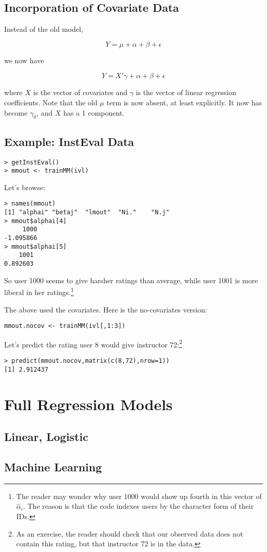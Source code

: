 \subsection{Incorporation of Covariate Data}

Instead of the old model, 

\begin{equation}
Y = \mu + \alpha + \beta + \epsilon
\end{equation}

we now have

\begin{equation}
Y = X' \gamma + \alpha + \beta + \epsilon
\end{equation}

where $X$ is the vector of covariates and $\gamma$ is the vector of
linear regression coefficients.  Note that the old $\mu$ term is now
absent, at least explicitly.  It now has become $\gamma_0$, and $X$ has
a 1 component.

\subsection{Example:  InstEval Data}

\begin{lstlisting}
> getInstEval()
> mmout <- trainMM(ivl)
\end{lstlisting}

Let's browse:

\begin{lstlisting}
> names(mmout)
[1] "alphai" "betaj"  "lmout"  "Ni."    "N.j" 
> mmout$alphai[4]
     1000 
-1.095866 
> mmout$alphai[5]
    1001 
0.892603 
\end{lstlisting}

So user 1000 seems to give harsher ratings than average, while user 1001
is more liberal in her ratings.\footnote{The reader may wonder why user
1000 would show up fourth in this vector of $\widehat{\alpha}_i$.  The
reason is that the code indexes users by the character form of their
IDs.}

The above used the covariates.  Here is the no-covariates version:

\begin{lstlisting}
mmout.nocov <- trainMM(ivl[,1:3])
\end{lstlisting}

Let's predict the rating user 8 would give instructor 72:\footnote{As an
exercise, the reader should check that our observed data does not
contain this rating, but that instructor 72 is in the data.}

\begin{lstlisting}
> predict(mmout.nocov,matrix(c(8,72),nrow=1))
[1] 2.912437
\end{lstlisting}

\section{Full Regression Models}

\subsection{Linear, Logistic}

\subsection{Machine Learning}
